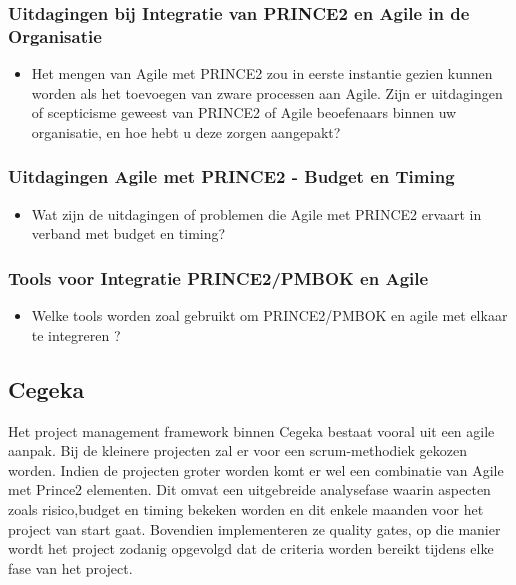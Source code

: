 \documentclass[dutch]{hogent-article}
\begin{document}
\subsubsection{Uitdagingen bij Integratie van PRINCE2 en Agile in de Organisatie}
\label{ssec:Uitdagingen en Overwinningen bij Integratie van PRINCE2 en Agile in de Organisatie}

\begin{itemize}
    \item Het mengen van Agile met PRINCE2 zou in eerste instantie gezien kunnen worden als het toevoegen van zware processen aan Agile. Zijn er uitdagingen of scepticisme geweest van PRINCE2 of Agile beoefenaars binnen uw organisatie, en hoe hebt u deze zorgen aangepakt?
\end{itemize}

\subsubsection{Uitdagingen Agile met PRINCE2 - Budget en Timing}
\label{ssec:Uitdagingen Agile met PRINCE2 - Budget en Timing}

\begin{itemize}
    \item Wat zijn de uitdagingen of problemen die Agile met PRINCE2 ervaart in verband met budget en timing?
\end{itemize}

\subsubsection{Tools voor Integratie PRINCE2/PMBOK en Agile}
\label{ssec:geslaagde-en-niet-geslaagde-projecten}

\begin{itemize}
    \item Welke tools worden zoal gebruikt om PRINCE2/PMBOK en agile met elkaar te integreren ?
\end{itemize}

\subsection{Cegeka}
\label{ssec:Inetum-Cegeka}

Het project management framework binnen Cegeka bestaat vooral uit een agile aanpak. Bij de kleinere projecten zal er voor een scrum-methodiek gekozen worden.
Indien de projecten groter worden komt er wel een combinatie van Agile met Prince2 elementen. Dit omvat een uitgebreide analysefase waarin aspecten zoals risico,budget en timing bekeken worden en dit enkele maanden voor het project van start gaat. Bovendien implementeren ze quality gates, op die manier wordt het project zodanig opgevolgd dat de criteria worden bereikt tijdens elke fase van het project.
\newline
\end{document}
